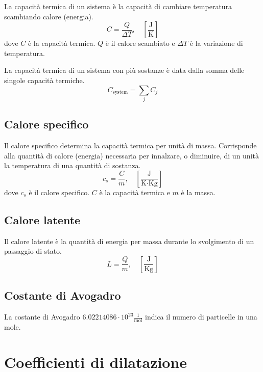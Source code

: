 \documentclass[a4paper]{article}
\begin{document}
La capacità termica di un sistema è la capacità di
cambiare temperatura scambiando calore (energia).
\[
    C=\frac{Q}{\Delta T}, \quad \left[\frac{\text{J}}{\text{K}}\right]
\]
dove \(C\) è la capacità termica.
\(Q\) è il calore scambiato e \(\Delta T\) è la variazione di temperatura.

La capacità termica di un sistema con più sostanze è data dalla somma
delle singole capacità termiche.
\[
    C_{\text{system}} = \sum_j C_j
\]

\subsection{Calore specifico}

Il calore specifico determina la capacità termica per unità di massa.
Corrisponde alla quantità di calore (energia) necessaria per innalzare,
o diminuire, di un unità la temperatura di una quantità di sostanza.
\[
    c_s = \frac{C}{m}, \quad \left[\frac{\text{J}}{\text{K}\cdot \text{Kg}}\right]
\]
dove \(c_s\) è il calore specifico. \(C\) è la capacità termica
e \(m\) è la massa.

\subsection{Calore latente}

Il calore latente è la quantità di energia per massa
durante lo svolgimento di un passaggio di stato.
\[
    L=\frac{Q}{m}, \quad \left[\frac{\text{J}}{\text{Kg}}\right]
\]


\pagebreak

\subsection{Costante di Avogadro}

La costante di Avogadro \(6.02214086 \cdot 10^{23} \frac{1}{\text{mol}}\)
indica il numero di particelle in una mole.

\section{Coefficienti di dilatazione}
\end{document}
